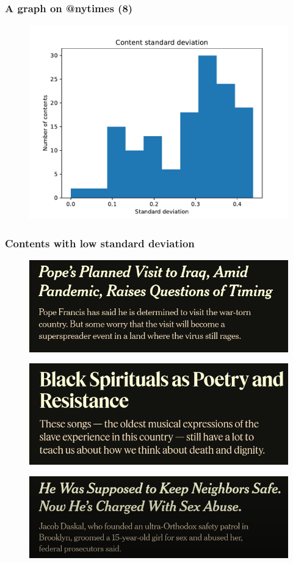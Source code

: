 \documentclass{beamer}
\begin{document}
\begin{frame}[c]
    \frametitle{A graph on @nytimes (8)}

    \begin{figure}[htpb]
        \centering
        \includegraphics[width=0.8\linewidth]{out/nytimes400/content-std-dev-hist.pdf}
    \end{figure}
\end{frame}

\begin{frame}[c]
    \frametitle{Contents with low standard deviation}
    \begin{figure}[htpb]
        \centering
        \includegraphics[width=0.5\linewidth]{img/low_stddev/1.png}
    \end{figure}

    \begin{figure}[htpb]
        \centering
        \includegraphics[width=0.5\linewidth]{img/low_stddev/2.png}
    \end{figure}
    \begin{figure}[htpb]
        \centering
        \includegraphics[width=0.5\linewidth]{img/low_stddev/3.png}
    \end{figure}
\end{frame}
\end{document}
